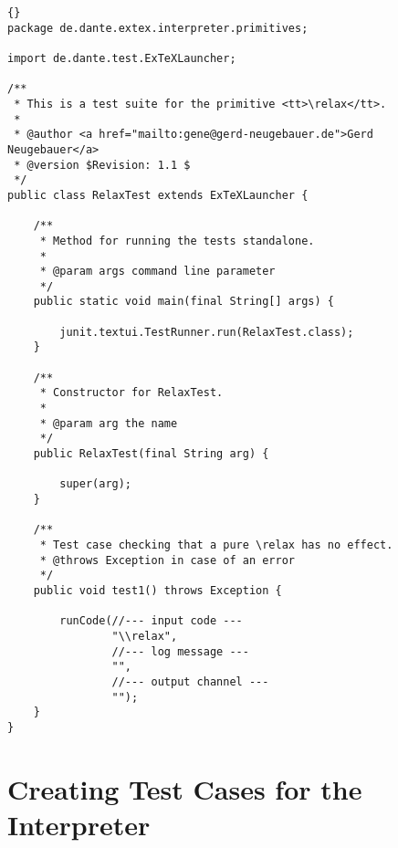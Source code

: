 \begin{lstlisting}{}
package de.dante.extex.interpreter.primitives;

import de.dante.test.ExTeXLauncher;

/**
 * This is a test suite for the primitive <tt>\relax</tt>.
 *
 * @author <a href="mailto:gene@gerd-neugebauer.de">Gerd Neugebauer</a>
 * @version $Revision: 1.1 $
 */
public class RelaxTest extends ExTeXLauncher {

    /**
     * Method for running the tests standalone.
     *
     * @param args command line parameter
     */
    public static void main(final String[] args) {

        junit.textui.TestRunner.run(RelaxTest.class);
    }

    /**
     * Constructor for RelaxTest.
     *
     * @param arg the name
     */
    public RelaxTest(final String arg) {

        super(arg);
    }

    /**
     * Test case checking that a pure \relax has no effect.
     * @throws Exception in case of an error
     */
    public void test1() throws Exception {

        runCode(//--- input code ---
                "\\relax",
                //--- log message ---
                "",
                //--- output channel ---
                "");
    }
}
\end{lstlisting}


\section{Creating Test Cases for the Interpreter}

\INCOMPLETE

